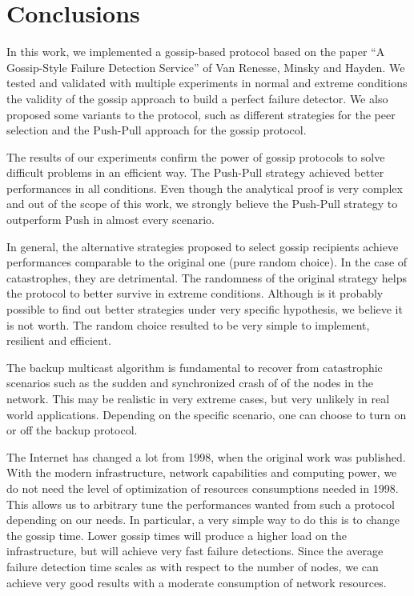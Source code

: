 \section{Conclusions}
\label{sec:conclusions}

In this work, we implemented a gossip-based protocol based on the paper ``A Gossip-Style Failure Detection Service'' of Van Renesse, Minsky and Hayden.
We tested and validated with multiple experiments in normal and extreme conditions the validity of the gossip approach to build a perfect failure detector.
We also proposed some variants to the protocol, such as different strategies for the peer selection and the Push-Pull approach for the gossip protocol.

The results of our experiments confirm the power of gossip protocols to solve difficult problems in an efficient way.
The Push-Pull strategy achieved better performances in all conditions.
Even though the analytical proof is very complex and out of the scope of this work, we strongly believe the Push-Pull strategy to outperform Push in almost every scenario.

In general, the alternative strategies proposed to select gossip recipients achieve performances comparable to the original one (pure random choice).
In the case of catastrophes, they are detrimental.
The randomness of the original strategy helps the protocol to better survive in extreme conditions.
Although is it probably possible to find out better strategies under very specific hypothesis, we believe it is not worth.
The random choice resulted to be very simple to implement, resilient and efficient.

The backup multicast algorithm is fundamental to recover from catastrophic scenarios such as the sudden and synchronized crash of  of the nodes in the network.
This may be realistic in very extreme cases, but very unlikely in real world applications.
Depending on the specific scenario, one can choose to turn on or off the backup protocol.

The Internet has changed a lot from 1998, when the original work was published.
With the modern infrastructure, network capabilities and computing power, we do not need the level of optimization of resources consumptions needed in 1998.
This allows us to arbitrary tune the performances wanted from such a protocol depending on our needs.
In particular, a very simple way to do this is to change the gossip time.
Lower gossip times will produce a higher load on the infrastructure, but will achieve very fast failure detections.
Since the average failure detection time scales as  with respect to the number of nodes, we can achieve very good results with a moderate consumption of network resources.

